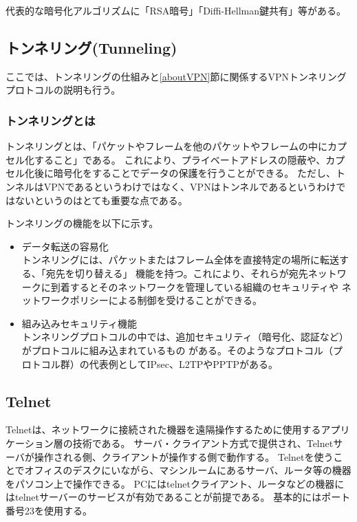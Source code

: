 \documentclass[12pt,a4paper,titlepage]{jsarticle}
\begin{document}
代表的な暗号化アルゴリズムに「RSA暗号」「Diffi-Hellman鍵共有」等がある。

\subsection{トンネリング(Tunneling)}
ここでは、トンネリングの仕組みと\ref{aboutVPN}節に関係するVPNトンネリングプロトコルの説明も行う。

\subsubsection*{トンネリングとは}

トンネリングとは、「パケットやフレームを他のパケットやフレームの中にカプセル化すること」である。
これにより、プライベートアドレスの隠蔽や、カプセル化後に暗号化をすることでデータの保護を行うことができる。
ただし、トンネルはVPNであるというわけではなく、VPNはトンネルであるというわけではないというのはとても重要な点である。

\par トンネリングの機能を以下に示す。
\begin{itemize}
    \item データ転送の容易化 \mbox{}\\
    トンネリングには、パケットまたはフレーム全体を直接特定の場所に転送する、「宛先を切り替える」
    機能を持つ。これにより、それらが宛先ネットワークに到着するとそのネットワークを管理している組織のセキュリティや
    ネットワークポリシーによる制御を受けることができる。
    \item 組み込みセキュリティ機能\mbox{}\\
    トンネリングプロトコルの中では、追加セキュリティ（暗号化、認証など）がプロトコルに組み込まれているもの
    がある。そのようなプロトコル（プロトコル群）の代表例としてIPsec、L2TPやPPTPがある。
\end{itemize}





\subsection{Telnet}
Telnetは、ネットワークに接続された機器を遠隔操作するために使用するアプリケーション層の技術である。
サーバ・クライアント方式で提供され、Telnetサーバが操作される側、クライアントが操作する側で動作する。
Telnetを使うことでオフィスのデスクにいながら、マシンルームにあるサーバ、ルータ等の機器をパソコン上で操作できる。
PCにはtelnetクライアント、ルータなどの機器にはtelnetサーバーのサービスが有効であることが前提である。
基本的にはポート番号23を使用する。
\end{document}
